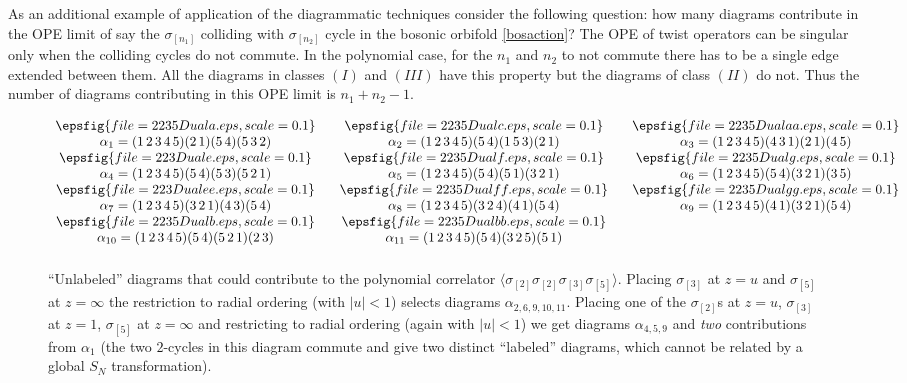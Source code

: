 \documentclass[letterpaper]{JHEP3}
\def\a{\alpha}
\def\a{\alpha}
\begin{document}
As an additional example of application of the diagrammatic techniques consider the following question:
 how many diagrams contribute in the OPE limit of say the $\sigma_{[n_1]}$  colliding with $\sigma_{[n_2]}$ cycle in the bosonic
 orbifold \eqref{bosaction}?
The OPE of twist operators can be singular only 
when the colliding cycles do not commute. In the 
polynomial case, for the $n_1$  and $n_2$  to not commute there has to be a single edge extended between them. All the diagrams in classes  $(I)$ and $(III)$ have this property but the diagrams of class $(II)$ do not. Thus
the number of diagrams contributing in this OPE limit is $n_1+n_2-1$.

\begin{figure}[htbp]
\begin{center}
$\begin{array}{c@{\hspace{0.25in}}c@{\hspace{0.25in}}c}
 \epsfig{file=2235Duala.eps,scale=0.1} & \epsfig{file=2235Dualc.eps,scale=0.1} & \epsfig{file=2235Dualaa.eps,scale=0.1}\\
\a_1=(1\,2\,3\,4\,5)(2\,1)(5\,4)(5\,3\,2) &
\a_2=(1\,2\,3\,4\,5)(5\,4)(1\,5\,3)(2\,1) &
\a_3=(1\,2\,3\,4\,5)(4\,3\,1)(2\,1)(4\,5)\\
 \epsfig{file=223Duale.eps,scale=0.1} & \epsfig{file=2235Dualf.eps,scale=0.1} & \epsfig{file=2235Dualg.eps,scale=0.1}\\
\a_4=(1\,2\,3\,4\,5)(5\,4)(5\,3)(5\,2\,1)&
\a_5=(1\,2\,3\,4\,5)(5\,4)(5\,1)(3\,2\,1)&
\a_6=(1\,2\,3\,4\,5)(5\,4)(3\,2\,1)(3\,5)\\
 \epsfig{file=223Dualee.eps,scale=0.1} & \epsfig{file=2235Dualff.eps,scale=0.1} & \epsfig{file=2235Dualgg.eps,scale=0.1}\\
\a_7=(1\,2\,3\,4\,5)(3\,2\,1)(4\,3)(5\,4)&
\a_8=(1\,2\,3\,4\,5)(3\,2\,4)(4\,1)(5\,4)&
\a_9=(1\,2\,3\,4\,5)(4\,1)(3\,2\,1)(5\,4)\\
 \epsfig{file=2235Dualb.eps,scale=0.1} & \epsfig{file=2235Dualbb.eps,scale=0.1} &\\
\a_{10}=(1\,2\,3\,4\,5)(5\,4)(5\,2\,1)(2\,3)&
\a_{11}=(1\,2\,3\,4\,5)(5\,4)(3\,2\,5)(5\,1)&
\\ [0.2cm]
\end{array}$
\end{center}
 \begin{center}
\caption{``Unlabeled'' diagrams that could contribute to the polynomial correlator $\langle \sigma_{[2]} \sigma_{[2]} \sigma_{[3]} \sigma_{[5]} \rangle$.
Placing  $\sigma_{[3]}$ at $z=u$   and $\sigma_{[5]}$ at $z = \infty$
the restriction to radial ordering (with $|u|<1$) selects  diagrams $\a_{2,6,9,10,11}$.
Placing one of the $\sigma_{[2]}$s at $z=u$,  $\sigma_{[3]}$ at $z=1$, $\sigma_{[5]}$ at $z = \infty$
and restricting to radial   ordering (again with $|u|<1$) we get diagrams
 $\a_{4,5,9}$ and {\it two} contributions from $\a_1$ (the two $2$-cycles in this diagram commute and give two  distinct ``labeled'' diagrams, which cannot
 be related by a global $S_N$ transformation).
 } \label{extrem2D}
\end{center}
\end{figure}	
\end{document}

